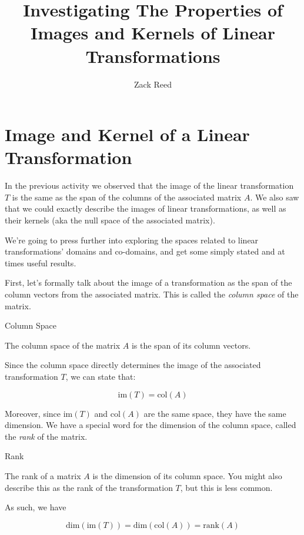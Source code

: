 \documentclass{ximera}
\author{Zack Reed}
\title{Investigating The Properties of Images and Kernels of Linear Transformations}\license{CC BY-NC-SA 4.0}
\begin{document}
\begin{abstract}

\end{abstract}
\maketitle


\section*{Image and Kernel of a Linear Transformation}

 
 
In the previous activity we observed that the image of the linear transformation $T$ is the same as the span of the columns of the associated matrix $A$. We also saw that we could exactly describe the images of linear transformations, as well as their kernels (aka the null space of the associated matrix).

We're going to press further into exploring the spaces related to linear transformations' domains and co-domains, and get some simply stated and at times useful results.

First, let's formally talk about the image of a transformation as the span of the column vectors from the associated matrix. This is called the \emph{column space} of the matrix.

\begin{definition}{Column Space}

The column space of the matrix $A$ is the span of its column vectors.

Since the column space directly determines the image of the associated transformation $T$, we can state that:

$$\mbox{im}(T)=\mbox{col}(A)$$
\end{definition}

Moreover, since $\mbox{im}(T)$ and $\mbox{col}(A)$ are the same space, they have the same dimension. We have a special word for the dimension of the column space, called the \emph{rank} of the matrix. 

\begin{definition}{Rank}

  The rank of a matrix $A$ is the dimension of its column space. You might also describe this as the rank of the transformation $T$, but this is less common. 

  As such, we have

$$\mbox{dim}(\mbox{im}(T))=\mbox{dim}(\mbox{col}(A))=\mbox{rank}(A)$$
\end{definition}
 
\end{document}

